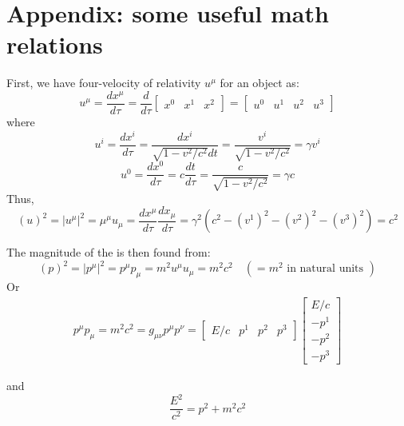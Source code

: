 \section{Appendix: some useful math relations}
First, we have four-velocity of relativity $u^{\mu}$ for an object as:
\begin{equation}
u^{\mu}=\frac{d x^{\mu}}{d \tau}=\frac{d}{d \tau}\left[\begin{array}{ccc}
{x^{0}} & {x^{1}} & {x^{2}}
\end{array}\right]=\left[\begin{array}{cccc}
{u^{0}} & {u^{1}} & {u^{2}} & {u^{3}}
\end{array}\right]
\end{equation}
where
\begin{equation}
u^{i}=\frac{d x^{i}}{d \tau}=\frac{d x^{i}}{\sqrt{1-v^{2} / c^{2}} d t}=\frac{v^{i}}{\sqrt{1-v^{2} / c^{2}}}=\gamma v^{i}
\end{equation}
\begin{equation}
u^{0}=\frac{d x^{0}}{d \tau}=c \frac{d t}{d \tau}=\frac{c}{\sqrt{1-v^{2} / c^{2}}}=\gamma c
\end{equation}
Thus,
\begin{equation}
(u)^{2}=\left|u^{\mu}\right|^{2}=\mu^{\mu} u_{\mu}=\frac{d x^{\mu}}{d \tau} \frac{d x_{\mu}}{d \tau}=\gamma^{2}\left(c^{2}-\left(v^{1}\right)^{2}-\left(v^{2}\right)^{2}-\left(v^{3}\right)^{2}\right)=c^{2}
\end{equation}

The magnitude of the  is  then found from:
\begin{equation}
(p)^{2}=\left|p^{\mu}\right|^{2}=p^{\mu} p_{\mu}=m^{2} u^{\mu} u_{\mu}=m^{2} c^{2} \quad\left(=m^{2} \text { in natural units }\right)
\end{equation}
 Or
\begin{equation}
    \begin{array}{l}
{p^{\mu} p_{\mu}=m^{2} c^{2}=g_{\mu \nu} p^{\mu} p^{\nu}=\left[\begin{array}{cccc}
{E / c} & {p^{1}} & {p^{2}} & {p^{3}}
\end{array}\right]\left[\begin{array}{c}
{E / c} \\
{-p^{1}} \\
{-p^{2}} \\
{-p^{3}}
\end{array}\right]}
\end{array}
\end{equation}

and
\begin{equation}
\frac{E^{2}}{c^{2}}=p^{2}+m^{2} c^{2}
\end{equation}